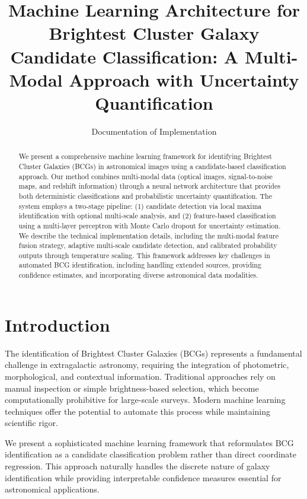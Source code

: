 \documentclass[twocolumn,10pt]{aastex631}
\begin{document}
\title{Machine Learning Architecture for Brightest Cluster Galaxy Candidate Classification: A Multi-Modal Approach with Uncertainty Quantification}

\author{Documentation of Implementation}

\begin{abstract}
We present a comprehensive machine learning framework for identifying Brightest Cluster Galaxies (BCGs) in astronomical images using a candidate-based classification approach. Our method combines multi-modal data (optical images, signal-to-noise maps, and redshift information) through a neural network architecture that provides both deterministic classifications and probabilistic uncertainty quantification. The system employs a two-stage pipeline: (1) candidate detection via local maxima identification with optional multi-scale analysis, and (2) feature-based classification using a multi-layer perceptron with Monte Carlo dropout for uncertainty estimation. We describe the technical implementation details, including the multi-modal feature fusion strategy, adaptive multi-scale candidate detection, and calibrated probability outputs through temperature scaling. This framework addresses key challenges in automated BCG identification, including handling extended sources, providing confidence estimates, and incorporating diverse astronomical data modalities.
\end{abstract}


\section{Introduction}

The identification of Brightest Cluster Galaxies (BCGs) represents a fundamental challenge in extragalactic astronomy, requiring the integration of photometric, morphological, and contextual information. Traditional approaches rely on manual inspection or simple brightness-based selection, which become computationally prohibitive for large-scale surveys. Modern machine learning techniques offer the potential to automate this process while maintaining scientific rigor.

We present a sophisticated machine learning framework that reformulates BCG identification as a candidate classification problem rather than direct coordinate regression. This approach naturally handles the discrete nature of galaxy identification while providing interpretable confidence measures essential for astronomical applications.
\end{document}
